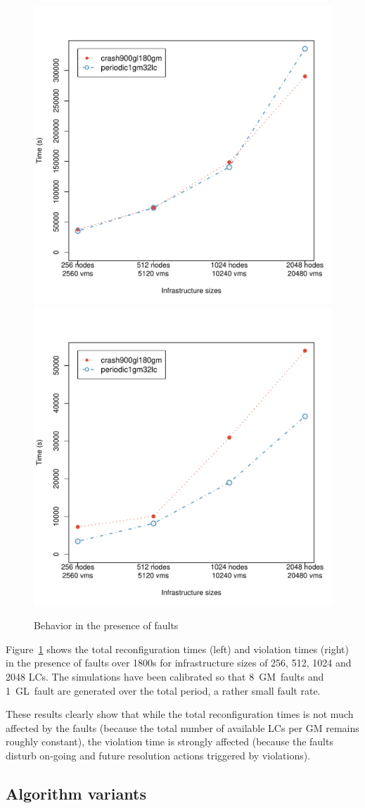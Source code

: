 
\begin{figure}\centering
  \includegraphics[width=.45\linewidth]{figures/snooze/crashAbs-reconfiguration.pdf}
  \quad
  \includegraphics[width=.45\linewidth]{figures/snooze/crashAbs-violation.pdf}
  \caption{Behavior in the presence of faults}
  \label{fig:snoozeFaults}
\end{figure}

Figure~\ref{fig:snoozeFaults} shows the total reconfiguration times
(left) and violation times (right) in the presence of faults over
1800s for infrastructure sizes of 256, 512, 1024 and 2048 LCs. The
simulations have been calibrated so that 8~GM~faults and 1~GL~fault
are generated over the total period, a rather small fault rate.

These results clearly show that while the total reconfiguration times
is not much affected by the faults (because the total number of
available LCs per GM remains roughly constant), the violation time is
strongly affected (because the faults disturb on-going and future
resolution actions triggered by violations).


\subsection{Algorithm variants}

